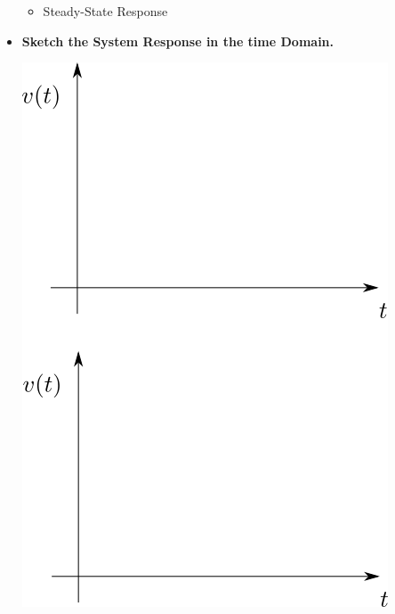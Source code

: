 \documentclass[11pt]{article}
\begin{document}
\begin{itemize}
\begin{itemize}
\item Steady-State Response

\end{itemize}



	\newpage
\item \textbf{ \Large Sketch the System Response in the time Domain.}

\includegraphics[scale=1]{lecture1_fig1.png} \\
	\end{itemize}
\end{document}
